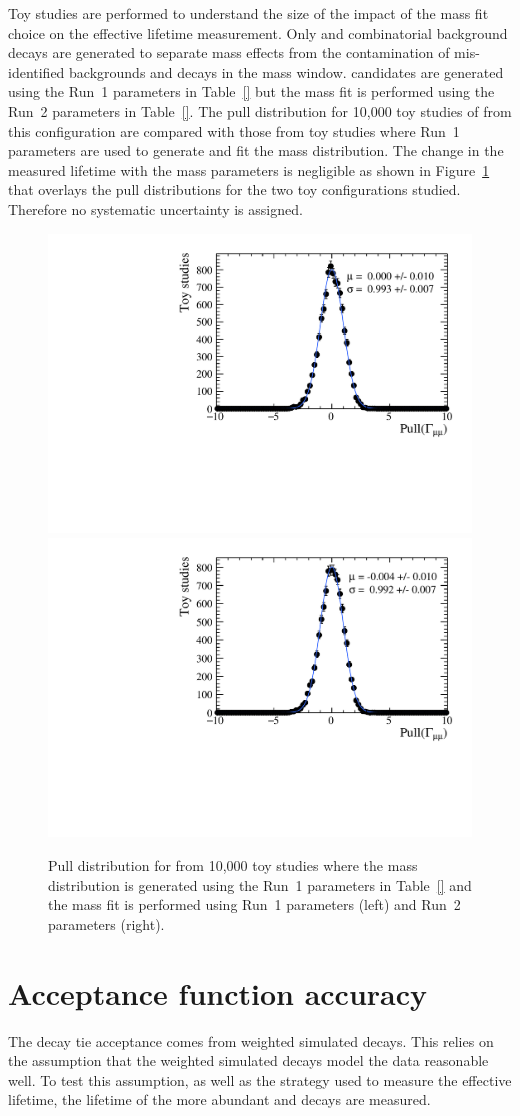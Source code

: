 Toy studies are performed to understand the size of the impact of the mass fit choice on the effective lifetime measurement. Only \bsmumu and combinatorial background decays are generated to separate mass \pdf effects from the contamination of mis-identified backgrounds and \bdmumu decays in the mass window. \bsmumu candidates are generated using the Run~1 parameters in Table~\ref{} but the mass fit is performed using the Run~2 parameters in Table~\ref{}. The pull distribution for 10,000 toy studies of \Gmumu from this configuration are compared with those from toy studies where Run~1 parameters are used to generate and fit the mass distribution. The change in the measured lifetime with the mass \pdf parameters is negligible as shown in Figure~\ref{fig:masspdfsyst} that overlays the pull distributions for the two toy configurations studied. Therefore no systematic uncertainty is assigned. 

\begin{figure}[htbp]
    \centering
        \includegraphics[width=0.49 \textwidth]{./Figs/LifetimeSystematics/Gamma_pull_mass_pdf_Run1.pdf}
        \includegraphics[width=0.49 \textwidth]{./Figs/LifetimeSystematics/Gamma_pull_mass_pdf_Run2.pdf}
    \caption{Pull distribution for \Gmumu from 10,000 toy studies where the \bsmumu mass distribution is generated using the Run~1 parameters in Table~\ref{} and the mass fit is performed using Run~1 parameters (left) and Run~2 parameters (right).}
    \label{fig:masspdfsyst}
\end{figure}


\section{Acceptance function accuracy}
\label{sec:accptsyst}
The decay tie acceptance comes from weighted simulated decays. This relies on the assumption that the weighted simulated decays model the data reasonable well. To test this assumption, as well as the strategy used to measure the \bsmumu effective lifetime, the lifetime of the more abundant \bdkpi and \bskk decays are measured.

